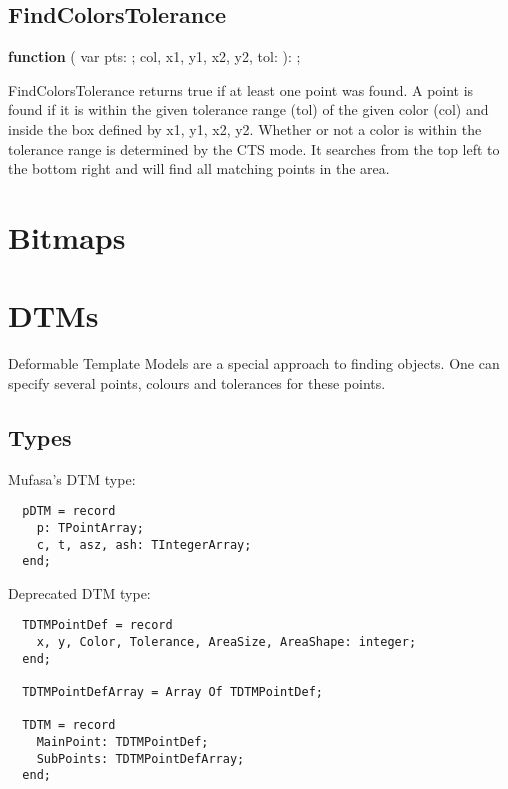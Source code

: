 \documentclass[a4paper]{report}
\begin{document}
\subsection{FindColorsTolerance}

\textbf{function} {\color{blue}{FindColorsTolerance}}({\color{typeRe d}
{var pts: }}{\color{typeGreen}{TPointArray}}; {\color{tyepTred}
{col, x1, y1, x2, y2, tol: }}{\color{typeGreen}{Integer}}): {\color{typeGreen}{Boolean}};

FindColorsTolerance returns true if at least one point was found. A point is found if it is within the
given tolerance range (tol) of the given color (col) and inside the box defined by x1, y1, x2, y2.
Whether or not a color is within the tolerance range is determined by the CTS mode.
It searches from the top left to the bottom right and will find all matching points in the area.

\section{Bitmaps}


\section{DTMs}

Deformable Template Models are a special approach to finding
objects. One can specify several points, colours and tolerances
for these points.

\subsection{Types}

Mufasa's DTM type:

\begin{verbatim}
  pDTM = record
    p: TPointArray;
    c, t, asz, ash: TIntegerArray;
  end; 
\end{verbatim}

Deprecated DTM type:

\begin{verbatim}
  TDTMPointDef = record
    x, y, Color, Tolerance, AreaSize, AreaShape: integer;
  end;

  TDTMPointDefArray = Array Of TDTMPointDef;

  TDTM = record
    MainPoint: TDTMPointDef;
    SubPoints: TDTMPointDefArray;
  end;    
\end{verbatim}
\end{document}
